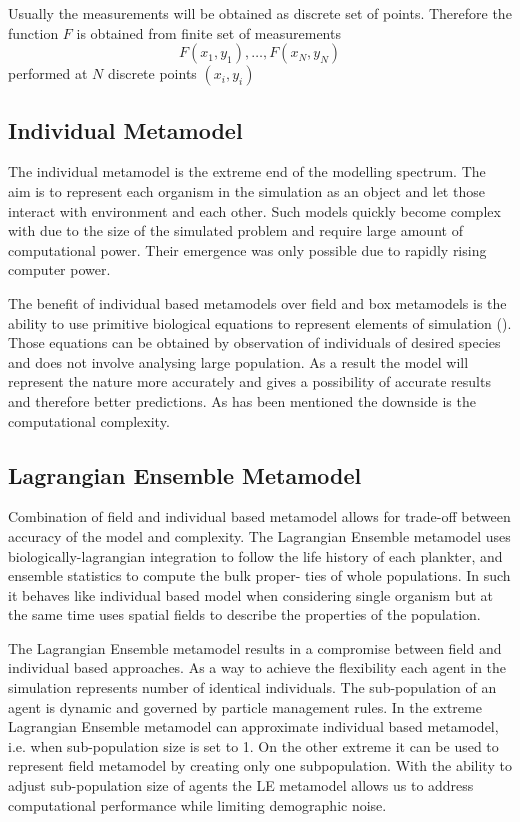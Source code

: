 \documentclass[12pt, a4paper]{report}
\begin{document}
Usually the measurements will be obtained as discrete set of points.
Therefore the function $F$ is obtained from finite set of
measurements $$F(x_1,y_1),\ldots,F(x_N,y_N)$$ performed at $N$ discrete
points $(x_i,y_i)$

\subsection{Individual Metamodel}\label{subsec:agent-meta}
The individual metamodel is the extreme end of the modelling spectrum.
The aim is to represent each organism in the simulation as an object
and let those interact with environment and each other. Such models
quickly become complex with due to the size of the simulated problem
and require large amount of computational power. Their emergence
was only possible due to rapidly rising computer power.

The benefit of individual based metamodels over field and box metamodels
is the ability to use primitive biological equations to represent
elements of simulation (\cite{IndvPlanktonEcosystems}). Those equations can be
obtained by observation of individuals of desired species and does not involve
analysing large population. As a result the model will represent the nature
more accurately and gives a possibility of accurate results and
therefore better predictions. As has been mentioned the downside
is the computational complexity.

\subsection{Lagrangian Ensemble Metamodel}\label{subsec:le-meta}
Combination of field and individual based metamodel allows for trade-off
between accuracy of the model and complexity. The Lagrangian Ensemble
metamodel uses biologically-lagrangian integration to follow the life
history of each plankter, and ensemble statistics to compute the bulk proper-
ties of whole populations. In such it behaves like individual based model
when considering single organism but at the same time uses spatial fields
to describe the properties of the population.

The Lagrangian Ensemble metamodel results in a compromise between field
and individual based approaches. As a way to achieve the flexibility
each agent in the simulation represents number of identical individuals.
The sub-population of an agent is dynamic and governed by particle
management rules. In the extreme Lagrangian Ensemble metamodel can
approximate individual based metamodel, i.e. when sub-population size is
set to 1. On the other extreme it can be used to represent field metamodel
by creating only one subpopulation. With the ability to adjust
sub-population size of agents the LE metamodel allows us to address
computational performance while limiting demographic noise.
\end{document}
